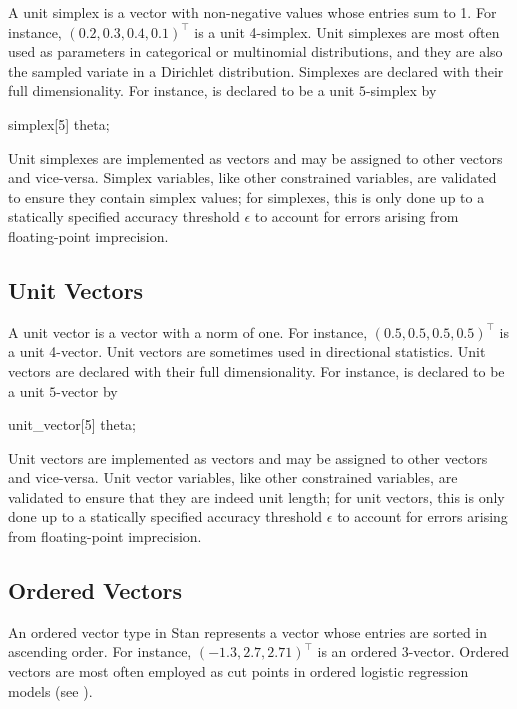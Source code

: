 A unit simplex is a vector with non-negative values whose entries sum
to 1.  For instance, $(0.2,0.3,0.4,0.1)^{\top}$ is a unit 4-simplex.
Unit simplexes are most often used as parameters in categorical
or multinomial distributions, and they are also the sampled variate in
a Dirichlet distribution.  Simplexes are declared with their full
dimensionality.  For instance,  is declared to
be a unit $5$-simplex by
%
\begin{stancode}
simplex[5] theta;
\end{stancode}
%

Unit simplexes are implemented as vectors and may be assigned to other
vectors and vice-versa.  Simplex variables, like other constrained
variables, are validated to ensure they contain simplex values; for
simplexes, this is only done up to a statically specified accuracy
threshold $\epsilon$ to account for errors arising from floating-point
imprecision.

\subsection{Unit Vectors}

A unit vector is a vector with a norm of one.  For instance,
$(0.5,0.5,0.5,0.5)^{\top}$ is a unit 4-vector.
Unit vectors are sometimes used in directional statistics.
Unit vectors are declared with their full
dimensionality.  For instance,  is declared to
be a unit $5$-vector by
%
\begin{stancode}
unit_vector[5] theta;
\end{stancode}
%
Unit vectors are implemented as vectors and may be assigned to other
vectors and vice-versa.  Unit vector variables, like other constrained
variables, are validated to ensure that they are indeed unit length; for
unit vectors, this is only done up to a statically specified accuracy
threshold $\epsilon$ to account for errors arising from floating-point
imprecision.

\subsection{Ordered Vectors}

An ordered vector type in Stan represents a vector whose entries are
sorted in ascending order.  For instance, $(-1.3,2.7,2.71)^{\top}$ is
an ordered 3-vector.  Ordered vectors are most often employed as cut
points in ordered logistic regression models (see
).

